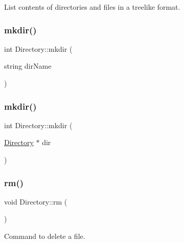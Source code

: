 List contents of directories and files in a treelike format. 

\mbox{\label{class_directory_adfec0eb4ee88844c1483363b14543e92}} 
\subsubsection{\texorpdfstring{mkdir()}{mkdir()}\hspace{0.1cm}{\footnotesize\ttfamily [1/2]}}
{\footnotesize\ttfamily int Directory\+::mkdir (\begin{DoxyParamCaption}\item[{string}]{dir\+Name }\end{DoxyParamCaption})}

\mbox{\label{class_directory_a02a77fbbfda041d430ec4d6f78ba8618}} 
\subsubsection{\texorpdfstring{mkdir()}{mkdir()}\hspace{0.1cm}{\footnotesize\ttfamily [2/2]}}
{\footnotesize\ttfamily int Directory\+::mkdir (\begin{DoxyParamCaption}\item[{\hyperlink{class_directory}{Directory} $\ast$}]{dir }\end{DoxyParamCaption})}

\mbox{\label{class_directory_ad764e9b4d0568c0acf788a15e0621f1a}} 
\subsubsection{\texorpdfstring{rm()}{rm()}}
{\footnotesize\ttfamily void Directory\+::rm (\begin{DoxyParamCaption}{ }\end{DoxyParamCaption})}



Command to delete a file. 

\mbox{\label{class_directory_abe82fee2bf7d59d277133848d8c9833d}} 
